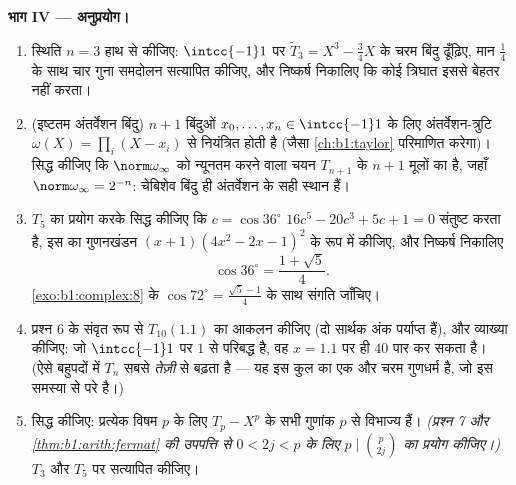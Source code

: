 \begin{problem}
\medskip \noindent\textbf{भाग IV --- अनुप्रयोग।}
\begin{enumerate}[resume]
  \item स्थिति $n = 3$ हाथ से कीजिए: $\intcc{-1}1$ पर $\widetilde T_3 = X^3
  - \frac34X$ के चरम बिंदु ढूँढ़िए, मान $\frac14$ के साथ चार गुना समदोलन
  सत्यापित कीजिए, और निष्कर्ष निकालिए कि कोई  त्रिघात इससे बेहतर
  नहीं करता।
  \item (इष्टतम अंतर्वेशन बिंदु) $n + 1$ बिंदुओं $x_0, \dots, x_n \in
  \intcc{-1}1$ के लिए अंतर्वेशन-त्रुटि $\omega(X) = \prod_i (X - x_i)$ से
  नियंत्रित होती है (जैसा \cref{ch:b1:taylor} परिमाणित करेगा)। सिद्ध कीजिए
  कि $\norm\omega_\infty$ को न्यूनतम करने वाला चयन $T_{n+1}$ के $n + 1$
  मूलों का  है, जहाँ $\norm\omega_\infty = 2^{-n}$: चेबिशेव बिंदु ही
  अंतर्वेशन के सही स्थान हैं।
  \item $T_5$ का प्रयोग करके सिद्ध कीजिए कि $c = \cos 36^\circ$ $16c^5 -
  20c^3 + 5c + 1 = 0$ संतुष्ट करता है, इस  का गुणनखंडन $(x + 1)(4x^2 -
  2x - 1)^2$ के रूप में कीजिए, और निष्कर्ष निकालिए
        \[
        \cos 36^\circ = \frac{1 + \sqrt5}4 .
        \]
        \cref{exo:b1:complex:8} के $\cos 72^\circ = \frac{\sqrt5 - 1}4$ के
        साथ संगति जाँचिए।
  \item प्रश्न 6 के संवृत रूप से $T_{10}(1.1)$ का आकलन कीजिए (दो सार्थक अंक
  पर्याप्त हैं), और व्याख्या कीजिए: जो  $\intcc{-1}1$ पर $1$ से परिबद्ध
  है, वह $x = 1.1$ पर ही $40$ पार कर सकता है। (ऐसे बहुपदों में $T_n$ सबसे
  \emph{तेज़ी} से बढ़ता है --- यह इस कुल का एक और चरम गुणधर्म है, जो इस
  समस्या से परे है।)
  \item {} सिद्ध कीजिए: प्रत्येक विषम  $p$ के लिए $T_p - X^p$
  के सभी गुणांक $p$ से विभाज्य हैं। \emph{(प्रश्न 7 और
  \cref{thm:b1:arith:fermat} की उपपत्ति से $0 < 2j < p$ के लिए $p \mid
  \binom p{2j}$ का प्रयोग कीजिए।)} $T_3$ और $T_5$ पर सत्यापित कीजिए।
\end{enumerate}


\end{problem}
